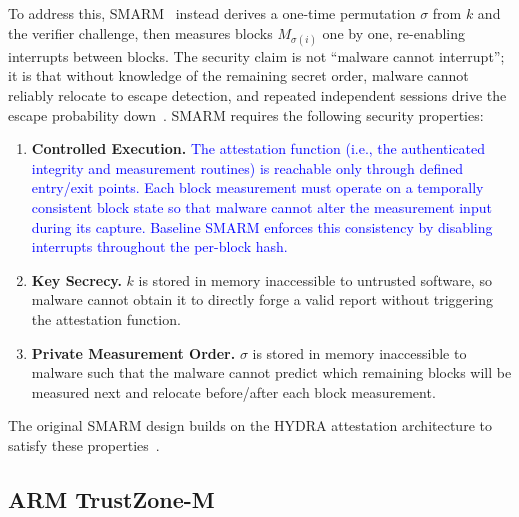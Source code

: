 \documentclass[conference]{IEEEtran}
\newcommand\ben[1]{\textcolor{blue}{#1}}
\begin{document}
To address this, SMARM~\cite{carpent2018smarm} instead derives a one-time permutation $\sigma$ from $k$ and the verifier challenge, then measures blocks $M_{\sigma(i)}$ one by one, re-enabling interrupts between blocks.
The security claim is not ``malware cannot interrupt''; it is that without knowledge of the remaining secret order, malware cannot reliably relocate to escape detection, and repeated independent sessions drive the escape probability down~\cite{carpent2018smarm}.
SMARM requires the following security properties:
\begin{enumerate}
  \item[\textbf{[S1]}] \textbf{Controlled Execution.}
    \ben{The attestation function (i.e., the authenticated integrity and measurement routines) is reachable only through defined entry/exit points. Each block measurement must operate on a temporally consistent block state so that malware cannot alter the measurement input during its capture. Baseline SMARM enforces this consistency by disabling interrupts throughout the per-block hash.}
  \item[\textbf{[S2]}] \textbf{Key Secrecy.}
    $k$ is stored in memory inaccessible to
    untrusted software, so malware cannot obtain it to directly forge a valid report without triggering the attestation function.
  \item[\textbf{[S3]}] \textbf{Private Measurement Order.}
    $\sigma$ is stored in memory inaccessible to malware such that the malware cannot predict which remaining blocks will be measured next and relocate before/after each block measurement.
\end{enumerate}
The original SMARM design builds on the HYDRA attestation architecture to satisfy these properties~\cite{eldefrawy2017hydra}.


\subsection{ARM TrustZone-M}

% 
\end{document}
